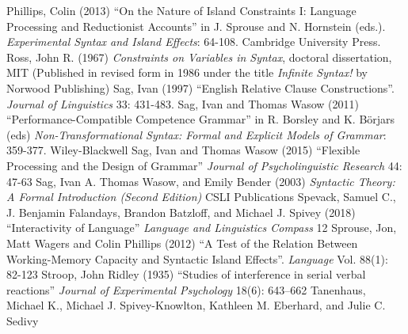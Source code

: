 \documentclass[a4paper]{article}
\begin{document}
Phillips, Colin (2013) ``On the Nature of Island Constraints I: Language Processing and Reductionist Accounts'' in
J. Sprouse and N. Hornstein (eds.).
{\it Experimental Syntax
and Island Effects}: 64-108.
Cambridge University
Press.
\newline
\newline
Ross, John R. (1967) {\it Constraints on Variables in Syntax}, doctoral dissertation, MIT  (Published in revised form in 1986 under the title {\it Infinite Syntax!} by Norwood Publishing)
\newline
\newline
Sag, Ivan (1997) ``English Relative Clause Constructions''.  {\it Journal of
Linguistics}
33:  
431-483.
\newline
\newline
Sag, Ivan and Thomas Wasow (2011) ``Performance-Compatible Competence Grammar'' in R. Borsley and K. Börjars (eds) {\it Non-Transformational Syntax: Formal and Explicit Models of Grammar}: 359-377. Wiley-Blackwell
\newline
\newline
Sag, Ivan and Thomas Wasow (2015) ``Flexible Processing and the Design of Grammar'' {\it Journal of Psycholinguistic Research} 44: 47-63
\newline
\newline
Sag, Ivan A. Thomas Wasow, and Emily Bender (2003) {\it Syntactic Theory: A Formal Introduction (Second Edition)} CSLI Publications
\newline
\newline
Spevack, Samuel C., 
J. Benjamin Falandays,
Brandon Batzloff, and
Michael J. Spivey (2018) ``Interactivity of Language'' {\it Language and Linguistics Compass} 12
\newline
\newline
Sprouse, Jon, Matt Wagers and Colin Phillips (2012) ``A Test of the Relation Between Working-Memory Capacity and Syntactic Island Effects''.  {\it Language}  Vol. 88(1): 82-123
\newline
\newline
Stroop, John Ridley (1935) ``Studies of interference in serial verbal reactions'' {\it Journal of Experimental Psychology} 18(6): 643–662
\newline
\newline
Tanenhaus, Michael K., Michael J. Spivey-Knowlton, Kathleen M. Eberhard, and Julie C. Sedivy
\end{document}
